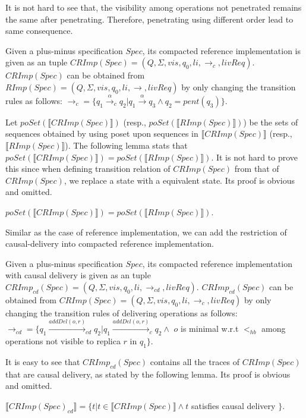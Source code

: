 {It is not hard to see that, the visibility among operations not penetrated remains the same after penetrating. Therefore, penetrating using different order lead to same consequence.

Given a plus-minus specification $Spec$, its compacted reference implementation is given as an tuple $CRImp(Spec) = (Q,\Sigma,vis,q_0,li,\rightarrow_c,livReq)$. $CRImp(Spec)$ can be obtained from $RImp(Spec) = (Q,\Sigma,vis,q_0,li,\rightarrow,livReq)$ by only changing the transition rules as follows:  $\rightarrow_c = \{ q_1 {\xrightarrow{\alpha}}_c q_2 \vert q_1 {\xrightarrow{\alpha}} q_3 \wedge q_2 = pent(q_3) \}$.

Let $poSet(\llbracket CRImp(Spec) \rrbracket)$ (resp., $poSet(\llbracket RImp(Spec) \rrbracket)$) be the sets of sequences obtained by using poset upon sequences in $\llbracket CRImp(Spec) \rrbracket$ (resp., $\llbracket RImp(Spec) \rrbracket$). The following lemma stats that $poSet(\llbracket CRImp(Spec) \rrbracket) = poSet(\llbracket RImp(Spec) \rrbracket)$. It is not hard to prove this since when defining transition relation of $CRImp(Spec)$ from that of $CRImp(Spec)$, we replace a state with a equivalent state. Its proof is obvious and omitted.

\begin{lemma}
\label{lemma:CRImpcdSpec and RImpcdSpec contain the same set of trace}
$poSet(\llbracket CRImp(Spec) \rrbracket) = poSet(\llbracket RImp(Spec) \rrbracket)$.
\end{lemma}

Similar as the case of reference implementation, we can add the restriction of causal-delivery into compacted reference implementation.

Given a plus-minus specification $Spec$, its compacted reference implementation with causal delivery is given as an tuple $CRImp_{cd}(Spec) = (Q,\Sigma,vis,q_0,li,\rightarrow_{cd},livReq)$. $CRImp_{cd}(Spec)$ can be obtained from $CRImp(Spec) = (Q,\Sigma,vis,q_0,li,\rightarrow_c,livReq)$ by only changing the transition rules of delivering operations as follows: $\rightarrow_{cd} = \{ q_1 {\xrightarrow{addDel(o,r)}}_{cd} q_2 \vert q_1 {\xrightarrow{addDel(o,r)}}_c q_2 \wedge$ $o$ is minimal w.r.t $<_{hb}$ among operations not visible to replica $r$ in $q_1 \}$.

It is easy to see that $CRImp_{cd}(Spec)$ contains all the traces of $CRImp(Spec)$ that are causal delivery, as stated by the following lemma. Its proof is obvious and omitted.

\begin{lemma}
\label{lemma:CRImpcdSpec contains all the traces of CRImpSpec that are causal delivery}

$\llbracket CRImp(Spec)_{cd} \rrbracket = \{ t \vert t \in \llbracket CRImp(Spec) \rrbracket \wedge t$ satisfies causal delivery $\}$.
\end{lemma}
}
